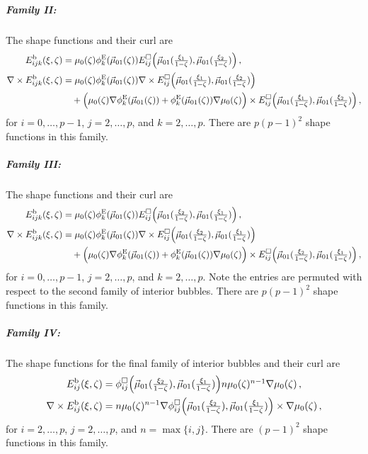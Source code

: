\subparagraph{Family II:}
The shape functions and their curl are
\begin{equation}
	\begin{aligned}
		E_{ijk}^{\mathrm{b}}(\xi,\zeta)&=\mu_0(\zeta)\phi_k^{\mathrm{E}}(\vec{\mu}_{01}(\zeta))
			E_{ij}^\square\Big(\vec{\mu}_{01}(\textstyle{\frac{\xi_1}{1-\zeta}}),\vec{\mu}_{01}(\textstyle{\frac{\xi_2}{1-\zeta}})\Big)\,,\\
		\nabla\times E_{ijk}^{\mathrm{b}}(\xi,\zeta)&=\mu_0(\zeta)\phi_k^{\mathrm{E}}(\vec{\mu}_{01}(\zeta))\nabla\times
			E_{ij}^\square\Big(\vec{\mu}_{01}(\textstyle{\frac{\xi_1}{1-\zeta}}),\vec{\mu}_{01}(\textstyle{\frac{\xi_2}{1-\zeta}})\Big)\\
				&\quad+\Big(\mu_0(\zeta)\nabla\phi_k^{\mathrm{E}}(\vec{\mu}_{01}(\zeta))+\phi_k^{\mathrm{E}}(\vec{\mu}_{01}(\zeta))\nabla\mu_0(\zeta)\Big)
					\times E_{ij}^\square\Big(\vec{\mu}_{01}(\textstyle{\frac{\xi_1}{1-\zeta}}),\vec{\mu}_{01}(\textstyle{\frac{\xi_2}{1-\zeta}})\Big)\,,
	\end{aligned}
	\label{eq:PyrHcurlInteriorII}
\end{equation}
for $i=0,\ldots,p-1$, $j=2,\ldots,p$, and $k=2,\ldots,p$.
There are $p(p-1)^2$ shape functions in this family.

\subparagraph{Family III:}
The shape functions and their curl are
\begin{equation}
	\begin{aligned}
		E_{ijk}^{\mathrm{b}}(\xi,\zeta)&=\mu_0(\zeta)\phi_k^{\mathrm{E}}(\vec{\mu}_{01}(\zeta))
			E_{ij}^\square\Big(\vec{\mu}_{01}(\textstyle{\frac{\xi_2}{1-\zeta}}),\vec{\mu}_{01}(\textstyle{\frac{\xi_1}{1-\zeta}})\Big)\,,\\
		\nabla\times E_{ijk}^{\mathrm{b}}(\xi,\zeta)&=\mu_0(\zeta)\phi_k^{\mathrm{E}}(\vec{\mu}_{01}(\zeta))\nabla\times
			E_{ij}^\square\Big(\vec{\mu}_{01}(\textstyle{\frac{\xi_2}{1-\zeta}}),\vec{\mu}_{01}(\textstyle{\frac{\xi_1}{1-\zeta}})\Big)\\
				&\quad+\Big(\mu_0(\zeta)\nabla\phi_k^{\mathrm{E}}(\vec{\mu}_{01}(\zeta))+\phi_k^{\mathrm{E}}(\vec{\mu}_{01}(\zeta))\nabla\mu_0(\zeta)\Big)
					\times E_{ij}^\square\Big(\vec{\mu}_{01}(\textstyle{\frac{\xi_2}{1-\zeta}}),\vec{\mu}_{01}(\textstyle{\frac{\xi_1}{1-\zeta}})\Big)\,,
	\end{aligned}
	\label{eq:PyrHcurlInteriorIII}
\end{equation}
for $i=0,\ldots,p-1$, $j=2,\ldots,p$, and $k=2,\ldots,p$.
Note the entries are permuted with respect to the second family of interior bubbles.
There are $p(p-1)^2$ shape functions in this family.

\subparagraph{Family IV:}
The shape functions for the final family of interior bubbles and their curl are
\begin{equation}
	\begin{aligned}
		E_{ij}^{\mathrm{b}}(\xi,\zeta)&=\phi_{ij}^\square\Big(\vec{\mu}_{01}(\textstyle{\frac{\xi_2}{1-\zeta}}),\vec{\mu}_{01}(\textstyle{\frac{\xi_1}{1-\zeta}})\Big)
			n\mu_0(\zeta)^{n-1}\nabla\mu_0(\zeta)\,,\\
		\nabla\times E_{ij}^{\mathrm{b}}(\xi,\zeta)&=n\mu_0(\zeta)^{n-1}
			\nabla\phi_{ij}^\square\Big(\vec{\mu}_{01}(\textstyle{\frac{\xi_2}{1-\zeta}}),\vec{\mu}_{01}(\textstyle{\frac{\xi_1}{1-\zeta}})\Big)\times\nabla\mu_0(\zeta)\,,
	\end{aligned}
	\label{eq:PyrHcurlInteriorIV}
\end{equation}
for $i=2,\ldots,p$, $j=2,\ldots,p$, and $n=\max\{i,j\}$.
There are $(p-1)^2$ shape functions in this family.


